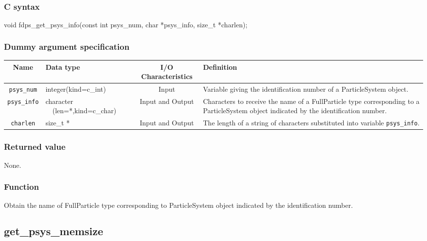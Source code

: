 \subsubsection*{C syntax}
\begin{screen}
\begin{spverbatim}
void fdps_get_psys_info(const int psys_num,
                        char *psys_info,
                        size_t *charlen);
\end{spverbatim}
\end{screen}

\subsubsection*{Dummy argument specification}
\begin{table}[h]
\begin{tabularx}{\linewidth}{cXcX}
\toprule
\rowcolor{Snow2}
Name & Data type & I/O Characteristics & Definition \\      
\midrule
\texttt{psys\_num} & integer(kind=c\_int) & Input & Variable giving the identification number of a ParticleSystem object.\\
\texttt{psys\_info} & character \newline\ \ (len=*,kind=c\_char) & Input and Output & Characters to receive the name of a FullParticle type corresponding to a ParticleSystem object indicated by the identification number. \\
\texttt{charlen} & size\_t * & Input and Output & The length of a string of characters substituted into variable \texttt{psys\_info}. \\
\bottomrule
\end{tabularx}
\end{table}

\subsubsection*{Returned value}
None.

\subsubsection*{Function}
Obtain the name of FullParticle type corresponding to ParticleSystem object indicated by the identification number.

\clearpage

\subsection{get\_psys\_memsize}
